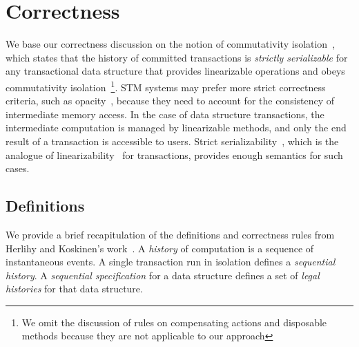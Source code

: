 \documentclass[]{sig-alternate-05-2015}
\begin{document}
\section{Correctness}
\label{sec:correctness}
We base our correctness discussion on the notion of commutativity isolation~\cite{herlihy2008transactional}, which states that the history of committed transactions is \emph{strictly serializable} for any transactional data structure that provides linearizable operations and obeys commutativity isolation~\footnote{We omit the discussion of rules on compensating actions and disposable methods because they are not applicable to our approach}.
STM systems may prefer more strict correctness criteria, such as opacity~\cite{guerraoui2008correctness}, because they need to account for the consistency of intermediate memory access.
In the case of data structure transactions, the intermediate computation is managed by linearizable methods, and only the end result of a transaction is accessible to users.
Strict serializability~\cite{papadimitriou1979serializability}, which is the analogue of linearizability~\cite{herlihy1990linearizability} for transactions, provides enough semantics for such cases.

\subsection{Definitions}
We provide a brief recapitulation of the definitions and correctness rules from Herlihy and Koskinen's work~\cite{herlihy2008transactional}.
A \emph{history} of computation is a sequence of instantaneous events.
A single transaction run in isolation defines a \emph{sequential history}.
A \emph{sequential specification} for a data structure defines a set of \emph{legal histories} for that data structure.
\end{document}
